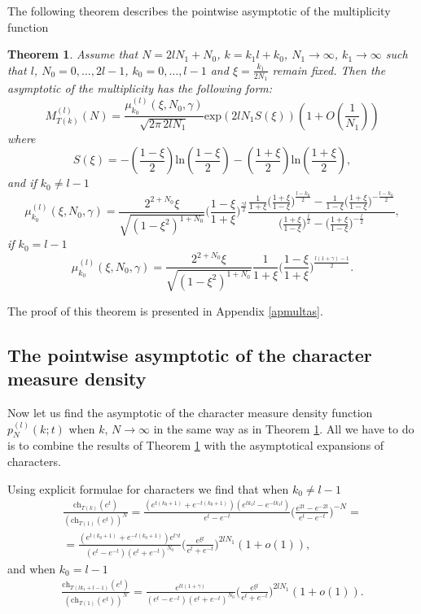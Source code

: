 \documentclass[11pt]{amsart}
\newtheorem{theorem}{Theorem}[section]
\begin{document}
The following theorem describes the pointwise asymptotic of the multiplicity function
\begin{theorem}\label{multasymptmain}
	Assume that $N=2lN_1+N_0$, $k=k_1l+k_0$, $N_1\to\infty$, $k_1\to\infty$ such that $l$, $N_0=0, \ldots, 2l-1$, $k_0=0, \ldots, l-1$ and $\xi=\frac{k_1}{2N_1}$ remain fixed. Then the asymptotic of the multiplicity has the following form:
    \begin{equation}\label{mass}
        M^{(l)}_{T(k)}(N)=\frac{\mu_{k_0}^{(l)}(\xi,N_0,\gamma)}{\sqrt{2\pi\, 2lN_1}}\mathrm{exp}(2lN_1 S(\xi))\left(1+O\left(\frac{1}{N_1}\right)\right)
    \end{equation}
    where
	\begin{equation*}
		S(\xi)=-\left(\frac{1-\xi}{2}\right)\mathrm{ln}\left(\frac{1-\xi}{2}\right)-\left(\frac{1+\xi}{2}\right)\mathrm{ln}\left(\frac{1+\xi}{2}\right),
	\end{equation*}
    and if $k_0\neq l-1$
    \begin{equation*}
		\mu_{k_0}^{(l)}(\xi,N_0,\gamma)=\frac{2^{2+N_0}\xi}{\sqrt{(1-\xi^2)^{1+N_0}}}\Big(\frac{1-\xi}{1+\xi}\Big)^{\frac{\gamma l}{2}}\frac{\frac{1}{1+\xi}\Big(\frac{1+\xi}{1-\xi}\Big)^{\frac{l-k_0}{2}}-\frac{1}{1-\xi}\Big(\frac{1+\xi}{1-\xi}\Big)^{-\frac{l-k_0}{2}}}{\Big(\frac{1+\xi}{1-\xi}\Big)^{\frac{l}{2}}-\Big(\frac{1+\xi}{1-\xi}\Big)^{-\frac{l}{2}}},
    \end{equation*}
    if $k_0=l-1$
    \begin{equation*}
		\mu_{k_0}^{(l)}(\xi,N_0,\gamma)=\frac{2^{2+N_0}\xi}{\sqrt{(1-\xi^2)^{1+N_0}}}\frac{1}{1+\xi}\Big(\frac{1-\xi}{1+\xi}\Big)^{\frac{l(1+\gamma)-1}{2}}.
    \end{equation*}
\end{theorem}
The proof of this theorem is presented in Appendix \ref{apmultas}.


\subsection{The pointwise asymptotic of the character measure density}
Now let us find the asymptotic of the character measure density function $p^{(l)}_N(k;t)$ when $k$, $N\to\infty$ in the same way as in Theorem \ref{multasymptmain}. All we have to do is to combine the results of Theorem \ref{multasymptmain} with the asymptotical expansions of characters.


Using explicit formulae for characters we find that when $k_0\neq l-1$
\begin{eqnarray*}
	\frac{\mathrm{ch}_{T(k)}(e^t)}{(\mathrm{ch}_{T(1)}(e^t))^N}=\frac{(e^{t(k_0+1)}+e^{-t(k_0+1)})(e^{tk_1l}-e^{-tk_1l})}{e^{t}-e^{-t}}\Big(\frac{e^{2t}-e^{-2t}}{e^{t}-e^{-t}}\Big)^{-N}=\\
	=\frac{(e^{t(k_0+1)}+e^{-t(k_0+1)})e^{t \gamma l}}{(e^{t}-e^{-t})(e^t+e^{-t})^{N_0}}\Big(\frac{e^{\xi t}}{e^{t}+e^{-t}}\Big)^{2lN_1}(1+o(1)),\nonumber
\end{eqnarray*}
and when $k_0=l-1$
\begin{eqnarray*}
	\frac{\mathrm{ch}_{T(lk_1+l-1)}(e^t)}{(\mathrm{ch}_{T(1)}(e^t))^N}=\frac{e^{tl(1+\gamma)}}{(e^{t}-e^{-t})(e^{t}+e^{-t})^{N_0}}\Big(\frac{e^{\xi t}}{e^{t}+e^{-t}}\Big)^{2lN_1}(1+o(1)).
\end{eqnarray*}
\end{document}
